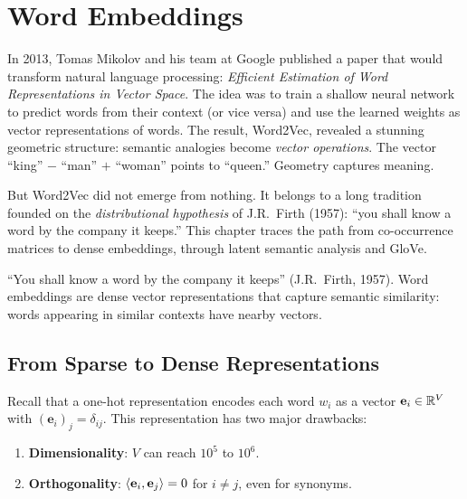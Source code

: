 \chapter{Word Embeddings}
\label{ch:embeddings}

In 2013, Tomas Mikolov and his team at Google published a paper that would transform natural language processing: \emph{Efficient Estimation of Word Representations in Vector Space}. The idea was to train a shallow neural network to predict words from their context (or vice versa) and use the learned weights as vector representations of words. The result, Word2Vec, revealed a stunning geometric structure: semantic analogies become \emph{vector operations}. The vector ``king'' $-$ ``man'' $+$ ``woman'' points to ``queen.'' Geometry captures meaning.

But Word2Vec did not emerge from nothing. It belongs to a long tradition founded on the \emph{distributional hypothesis} of J.R.\ Firth (1957): ``you shall know a word by the company it keeps.'' This chapter traces the path from co-occurrence matrices to dense embeddings, through latent semantic analysis and GloVe.

\begin{intuition}[title=\textbf{The distributional hypothesis}]
``You shall know a word by the company it keeps'' (J.R.\ Firth, 1957). Word
embeddings are dense vector representations that capture semantic similarity:
words appearing in similar contexts have nearby vectors.
\end{intuition}

\section{From Sparse to Dense Representations}
\label{sec:emb:motivation}

Recall that a one-hot representation encodes each word $w_i$ as a vector
$\mathbf{e}_i \in \mathbb{R}^V$ with $(\mathbf{e}_i)_j = \delta_{ij}$. This
representation has two major drawbacks:
\begin{enumerate}
    \item \textbf{Dimensionality}: $V$ can reach $10^5$ to $10^6$.
    \item \textbf{Orthogonality}: $\langle \mathbf{e}_i, \mathbf{e}_j \rangle = 0$
          for $i \neq j$, even for synonyms.
\end{enumerate}

